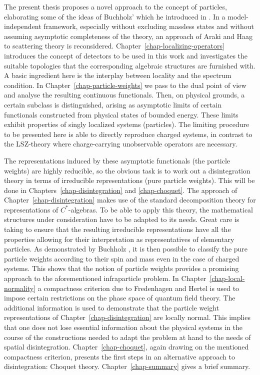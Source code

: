 \documentclass[11pt,twoside,openright]{report}
\theoremstyle{definition}
\theoremstyle{plain}
\theoremstyle{remark}
\theoremstyle{assumption}
\begin{document}
The present thesis proposes a novel approach to the concept of
particles, elaborating some of the ideas of Buchholz' which he
introduced in \cite{buchholz:1986b}. In a model-independent framework,
especially without excluding massless states and without assuming
asymptotic completeness of the theory, an approach of Araki and Haag
\cite{araki/haag:1967} to scattering theory is reconsidered.
Chapter~\ref{chap-localizing-operators} introduces the concept of 
detectors to be used in this work and investigates the suitable
topologies that the corresponding algebraic structures are furnished
with. A basic ingredient here is the interplay between locality and
the spectrum condition. In Chapter~\ref{chap-particle-weights} we pass
to the dual point of view and analyse the resulting continuous
functionals. Then, on physical grounds, a certain subclass is
distinguished, arising as asymptotic limits of certain functionals
constructed from physical states of bounded energy. These limits
exhibit properties of singly localized systems (particles). The
limiting procedure to be presented here is able to directly reproduce
charged systems, in contrast to the LSZ-theory where charge-carrying
unobservable operators are necessary.

The representations induced by these asymptotic functionals (the
particle weights) are highly reducible, so the obvious task is to work
out a disintegration theory in terms of irreducible representations
(pure particle weights). This will be done in
Chapters~\ref{chap-disintegration} and \ref{chap-choquet}. The
approach of Chapter~\ref{chap-disintegration} makes use of the
standard decomposition theory for representations of
$C^*$-algebras. To be able to apply this theory, the mathematical
structures under consideration have to be adapted to its needs. Great
care is taking to ensure that the resulting irreducible
representations have all the properties allowing for their
interpretation as representatives of elementary particles. As
demonstrated by Buchholz \cite{buchholz/porrmann}, it is then possible
to classify the pure particle weights according to their spin and
mass even in the case of charged systems. This shows that the notion
of particle weights provides a promising approach to the
aforementioned infraparticle problem. In
Chapter~\ref{chap-local-normality} a compactness criterion due to
Fredenhagen and Hertel is used to impose certain restrictions on the
phase space of quantum field theory. The additional information is
used to demonstrate that the particle weight representations of
Chapter~\ref{chap-disintegration} are locally normal. This implies
that one does not lose essential information about the physical
systems in the course of the constructions needed to adapt the problem
at hand to the needs of spatial disintegration.
Chapter~\ref{chap-choquet}, again drawing on the mentioned compactness
criterion, presents the first steps in an alternative approach to
disintegration: Choquet theory. Chapter~\ref{chap-summary} gives a
brief summary.
 
\end{document}
